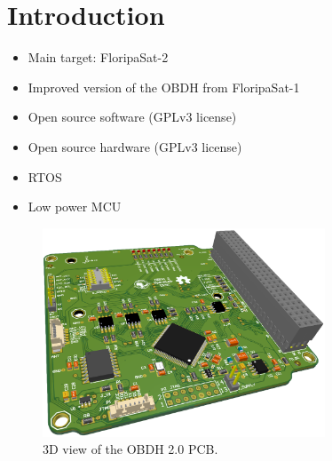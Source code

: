 %
%
%
%
%

%
%
%
%
%
%

\chapter{Introduction} \label{ch:introduction}

\begin{itemize}
    \item Main target: FloripaSat-2
    \item Improved version of the OBDH from FloripaSat-1
    \item Open source software (GPLv3 license)
    \item Open source hardware (GPLv3 license)
    \item RTOS
    \item Low power MCU
\end{itemize}

\begin{figure}[!ht]
    \begin{center}
        \includegraphics[width=0.75\textwidth]{figures/obdh2-pcb-3d.png}
        \caption{3D view of the OBDH 2.0 PCB.}
        \label{fig:pcb-3d}
    \end{center}
\end{figure}
